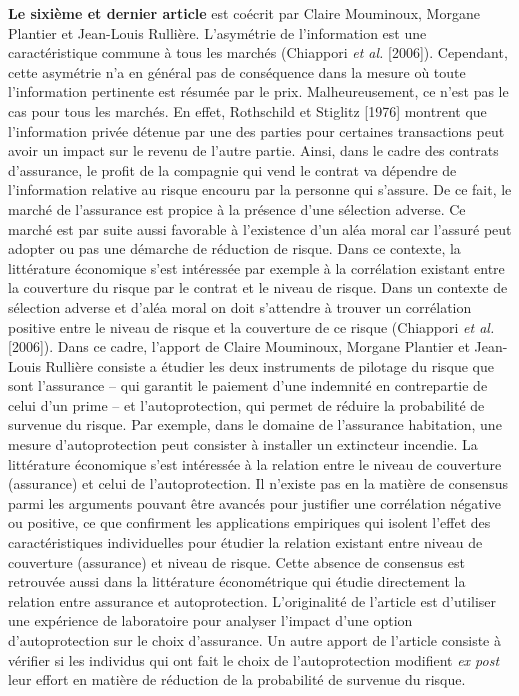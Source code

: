\begin{Article}
\begin{refsection}[Intro]
\textbf{Le sixième et dernier article} est coécrit par Claire Mouminoux,
Morgane Plantier et Jean-Louis Rullière. L'asymétrie de l'information
est une caractéristique commune à tous les marchés (Chiappori \emph{et al.} [2006]). Cependant, cette asymétrie n'a en général pas de conséquence
dans la mesure où toute l'information pertinente est résumée par le
prix. Malheureusement, ce n'est pas le cas pour tous les marchés. En
effet, Rothschild et Stiglitz [1976] montrent que l'information privée
détenue par une des parties pour certaines transactions peut avoir un
impact sur le revenu de l'autre partie. Ainsi, dans le cadre des
contrats d'assurance, le profit de la compagnie qui vend le contrat va
dépendre de l'information relative au risque encouru par la personne qui
s'assure. De ce fait, le marché de l'assurance est propice à la présence
d'une sélection adverse. Ce marché est par suite aussi favorable à
l'existence d'un aléa moral car l'assuré peut adopter ou pas une
démarche de réduction de risque. Dans ce contexte, la littérature
économique s'est intéressée par exemple à la corrélation existant entre
la couverture du risque par le contrat et le niveau de risque. Dans un
contexte de sélection adverse et d'aléa moral on doit s'attendre à
trouver un corrélation positive entre le niveau de risque et la
couverture de ce risque (Chiappori \emph{et al.} [2006]). Dans ce cadre,
l'apport de Claire Mouminoux, Morgane Plantier et Jean-Louis Rullière
consiste a étudier les deux instruments de pilotage du risque que sont
l'assurance -- qui garantit le paiement d'une indemnité en contrepartie
de celui d'un prime -- et l'autoprotection, qui permet de réduire la
probabilité de survenue du risque. Par exemple, dans le domaine de
l'assurance habitation, une mesure d'autoprotection peut consister à
installer un extincteur incendie. La littérature économique s'est
intéressée à la relation entre le niveau de couverture (assurance) et celui
de l'autoprotection. Il n'existe pas en la matière de consensus parmi les
arguments pouvant être avancés pour justifier une corrélation négative
ou positive, ce que confirment les applications empiriques qui isolent
l'effet des caractéristiques individuelles pour étudier la relation
existant entre niveau de couverture (assurance) et niveau de risque.
Cette absence de consensus est retrouvée aussi dans la littérature
économétrique qui étudie directement la relation entre assurance et
autoprotection. L'originalité de l'article est d'utiliser une
expérience de laboratoire pour analyser l'impact d'une option
d'autoprotection sur le choix d'assurance. Un autre apport de l'article
consiste à vérifier si les individus qui ont fait le choix de l'autoprotection modifient \emph{ex post} leur effort en matière de réduction de la
probabilité de survenue du risque.


\end{refsection}
\end{Article}
